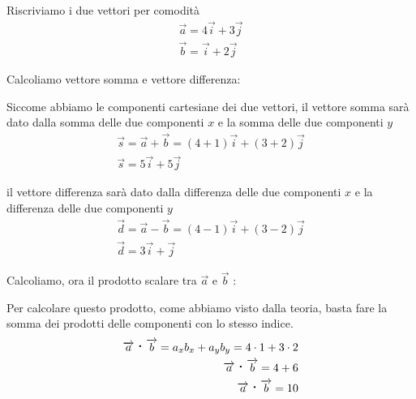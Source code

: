 Riscriviamo i due vettori per comodità
\begin{align*}
\overrightarrow{a} = 4 \overrightarrow{i} + 3 \overrightarrow{j} \\
\overrightarrow{b} = \overrightarrow{i} + 2 \overrightarrow{j}
\end{align*}

Calcoliamo vettore somma e vettore differenza:

Siccome abbiamo le componenti cartesiane dei due vettori, il vettore somma sarà dato dalla somma delle due componenti $ x $ e la somma delle due componenti $ y $
\begin{align*}
\overrightarrow{s} = \overrightarrow{a} + \overrightarrow{b} = ( 4 + 1 )\overrightarrow{i} + ( 3 + 2 ) \overrightarrow{j} \\
\overrightarrow{s} = 5 \overrightarrow{i} + 5 \overrightarrow{j}
\end{align*}

il vettore differenza sarà dato dalla differenza delle due componenti $ x $ e la differenza delle due componenti $ y $
\begin{align*}
\overrightarrow{d} = \overrightarrow{a} - \overrightarrow{b} = ( 4 - 1 )\overrightarrow{i} + ( 3 - 2 ) \overrightarrow{j} \\
\overrightarrow{d} = 3 \overrightarrow{i} + \overrightarrow{j}
\end{align*}

Calcoliamo, ora il prodotto scalare tra $ \overrightarrow{a} $ e $ \overrightarrow{b} $ :

Per calcolare questo prodotto, come abbiamo visto dalla teoria, basta fare la somma dei prodotti delle componenti con lo stesso indice.
\begin{align*}
\overrightarrow{a} \prodscal \overrightarrow{b} = a_{x} b_{x} + a_{y} b_{y} = 4 \cdot 1 + 3 \cdot 2 \\
\overrightarrow{a} \prodscal \overrightarrow{b} = 4 + 6 \\
\overrightarrow{a} \prodscal \overrightarrow{b} = 10
\end{align*}

